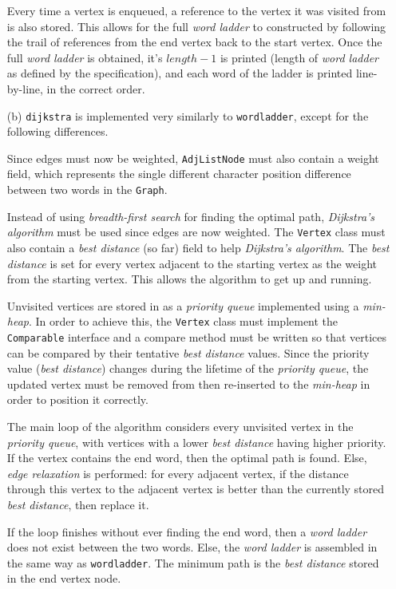 \documentclass{article}
\begin{document}
\begin{itemize}
    Every time a vertex is enqueued, a reference to the vertex it was visited from is also stored. This allows for the full \textit{word ladder} to constructed by following the trail of references from the end vertex back to the start vertex. Once the full \textit{word ladder} is obtained, it's $length - 1$ is printed (length of \textit{word ladder} as defined by the specification), and each word of the ladder is printed line-by-line, in the correct order.

    \item[(b)]
    \texttt{dijkstra} is implemented very similarly to \texttt{wordladder}, except for the following differences.

    Since edges must now be weighted, \texttt{AdjListNode} must also contain a weight field, which represents the single different character position difference between two words in the \texttt{Graph}.

    Instead of using \textit{breadth-first search} for finding the optimal path, \textit{Dijkstra's algorithm} must be used since edges are now weighted. The \texttt{Vertex} class must also contain a \textit{best distance} (so far) field to help \textit{Dijkstra's algorithm}. The \textit{best distance} is set for every vertex adjacent to the starting vertex as the weight from the starting vertex. This allows the algorithm to get up and running.

    Unvisited vertices are stored in as a \textit{priority queue} implemented using a \textit{min-heap}. In order to achieve this, the \texttt{Vertex} class must implement the \texttt{Comparable} interface and a compare method must be written so that vertices can be compared by their tentative \textit{best distance} values. Since the priority value (\textit{best distance}) changes during the lifetime of the \textit{priority queue}, the updated vertex must be removed from then re-inserted to the \textit{min-heap} in order to position it correctly.

    The main loop of the algorithm considers every unvisited vertex in the \textit{priority queue}, with vertices with a lower \textit{best distance} having higher priority. If the vertex contains the end word, then the optimal path is found. Else, \textit{edge relaxation} is performed: for every adjacent vertex, if the distance through this vertex to the adjacent vertex is better than the currently stored \textit{best distance}, then replace it.

    If the loop finishes without ever finding the end word, then a \textit{word ladder} does not exist between the two words. Else, the \textit{word ladder} is assembled in the same way as \texttt{wordladder}. The minimum path is the \textit{best distance} stored in the end vertex node.
\end{itemize}
\end{document}

